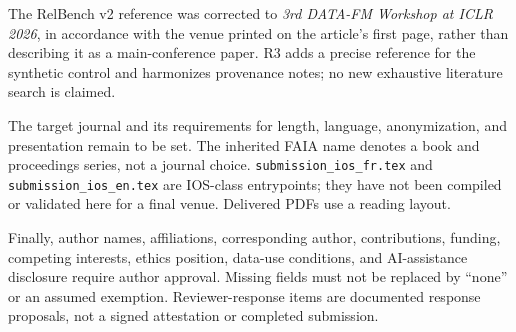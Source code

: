 \documentclass[10pt,a4paper]{article}
\newcommand{\src}[1]{{\small\nolinkurl{#1}}}
\begin{document}
The RelBench v2 reference was corrected to \emph{3rd DATA-FM Workshop at ICLR 2026}, in accordance with the venue printed on the article's first page, rather than describing it as a main-conference paper\cite{gu2026relbench}. R3 adds a precise reference for the synthetic control and harmonizes provenance notes; no new exhaustive literature search is claimed.

The target journal and its requirements for length, language, anonymization, and presentation remain to be set. The inherited FAIA name denotes a book and proceedings series, not a journal choice. \src{submission_ios_fr.tex} and \src{submission_ios_en.tex} are IOS-class entrypoints; they have not been compiled or validated here for a final venue. Delivered PDFs use a reading layout.

Finally, author names, affiliations, corresponding author, contributions, funding, competing interests, ethics position, data-use conditions, and AI-assistance disclosure require author approval. Missing fields must not be replaced by “none” or an assumed exemption. Reviewer-response items are documented response proposals, not a signed attestation or completed submission.



\end{document}
